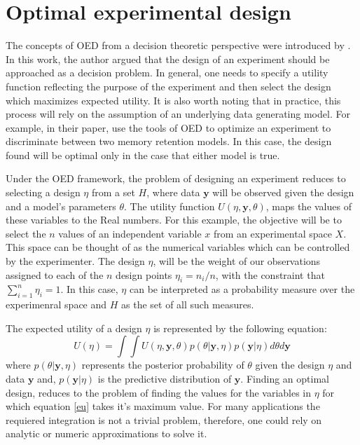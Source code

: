 \documentclass[preprint,review,12pt]{elsarticle}
\begin{document}
\section{Optimal experimental design}

The concepts of OED from a decision theoretic perspective were introduced by \citet{Lindley1972}. In this work, the author argued that the design of an experiment should be approached as a decision problem. In general, one needs to specify a utility function reflecting the purpose of the experiment and then select the design which maximizes expected utility. It is also worth noting that in practice, this process will rely on the assumption of an underlying data generating model. For example, in their paper, \citet{Myung2009} use the tools of OED to optimize an experiment to discriminate between two memory retention models. In this case, the design found will be optimal only in the case that either model is true.

Under the OED framework, the problem of designing an experiment reduces to selecting a design $\eta$ from a set $H$, where data $\mathbf{y}$ will be observed given the design and a model's parameters $\theta$. The utility function $U(\eta,\mathbf{y},\theta)$, maps the values of these variables to the Real numbers. For this example, the objective will be to select the $n$ values of an independent variable $x$ from an experimental space $X$. This space can be thought of as the numerical variables which can be controlled by the experimenter. The design $\eta$, will be the weight of our observations assigned to each of the $n$ design points $\eta_i=n_i/n$, with the constraint that  $\sum_{i=1}^{n}\eta_i = 1$. In this case, $\eta$ can be interpreted as a probability measure over the experimenral space and $H$ as the set of all such measures.

The expected utility of a design $\eta$ is represented by the following equation:
\begin{equation}
U(\eta)=\int \int U(\eta,\mathbf{y},\theta)p(\theta|\mathbf{y},\eta)p(\mathbf{y}|\eta) d\theta d\mathbf{y}
\label{eu}
\end{equation}
where $p(\theta|\mathbf{y},\eta)$ represents the posterior probability of $\theta$ given the design $\eta$ and data $\mathbf{y}$ and, $p(\mathbf{y}|\eta)$ is the predictive distribution of $\mathbf{y}$. Finding an optimal design, reduces to the problem of finding the values for the variables in $\eta$ for which equation \ref{eu} takes it's maximum value. For many applications the requiered integration is not a trivial problem, therefore, one could rely on analytic or numeric approximations to solve it.
\end{document}
